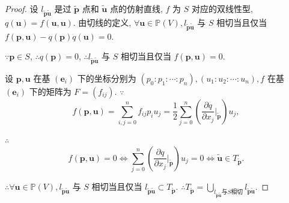 \documentclass[color=black,device=normal,lang=cn,mode=geye]{elegantnote}
\begin{document}
\begin{proof}
    设 $l_{\tilde{\boldsymbol{p}}\tilde{\boldsymbol{u}}}$ 是过 $\tilde{\boldsymbol{p}}$ 点和 $\tilde{\boldsymbol{u}}$ 点的仿射直线, $f$ 为 $S$ 对应的双线性型, $q(\boldsymbol{u})=f(\boldsymbol{u},\boldsymbol{u})$. 由切线的定义, $\forall\boldsymbol{u}\in\mathbb{P}(V),l_{\tilde{\boldsymbol{p}}\tilde{\boldsymbol{u}}}$ 与 $S$ 相切当且仅当 $f(\boldsymbol{p},\boldsymbol{u})-q(\boldsymbol{p})q(\boldsymbol{u})=0$.

    $\because\boldsymbol{p}\in S$, $\therefore q(\boldsymbol{p})=0$, $\therefore l_{\tilde{\boldsymbol{p}}\tilde{\boldsymbol{u}}}$ 与 $S$ 相切当且仅当 $f(\boldsymbol{p},\boldsymbol{u})=0$.

    设 $\boldsymbol{p},\boldsymbol{u}$ 在基 $(\boldsymbol{e}_i)$ 下的坐标分别为 $(p_0:p_1:\cdots:p_n),(u_1:u_2:\cdots:u_n),f$ 在基 $(\boldsymbol{e}_i)$ 下的矩阵为 $F=(f_{ij})$. $\because$
    \[f(\boldsymbol{p},\boldsymbol{u})=\sum\limits_{i,j=0}^nf_{ij}p_iu_j=\dfrac{1}{2}\sum\limits_{j=0}^n\left(\dfrac{\partial q}{\partial x_j}\bigg|_{\tilde{\boldsymbol{p}}}\right)u_j,\]

    $\therefore$
    \[f(\boldsymbol{p},\boldsymbol{u})=0\Leftrightarrow\sum\limits_{j=0}^n\left(\dfrac{\partial q}{\partial x_j}\bigg|_{\tilde{\boldsymbol{p}}}\right)u_j=0\Leftrightarrow\tilde{\boldsymbol{u}}\in T_{\tilde{\boldsymbol{p}}}.\]

    $\therefore\forall\boldsymbol{u}\in\mathbb{P}(V),l_{\tilde{\boldsymbol{p}}\tilde{\boldsymbol{u}}}$ 与 $S$ 相切当且仅当 $l_{\tilde{\boldsymbol{p}}\tilde{\boldsymbol{u}}}\subset T_{\tilde{\boldsymbol{p}}}$. $\therefore T_{\tilde{\boldsymbol{p}}}=\bigcup\limits_{l_{\tilde{\boldsymbol{p}}\tilde{\boldsymbol{u}}}\text{与}S\text{相切}}l_{\tilde{\boldsymbol{p}}\tilde{\boldsymbol{u}}}$.
\end{proof}
\end{document}
